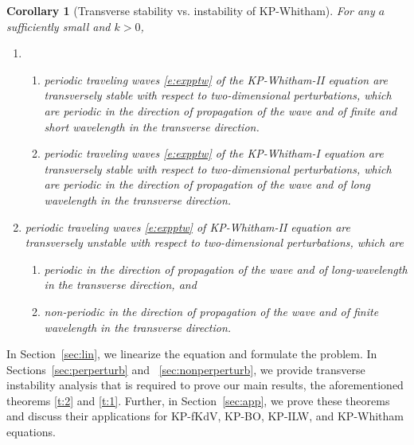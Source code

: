 \documentclass[12pt]{amsart}    %
\newtheorem{corollary}[theorem]{Corollary}
\numberwithin{equation}{section}
\begin{document}
\begin{corollary}[Transverse stability vs. instability of KP-Whitham]\label{c:whitham}
For any $a$ sufficiently small and $k>0$, 
\begin{enumerate}
\item 
\begin{enumerate}
    \item periodic traveling waves \eqref{e:expptw} of the KP-Whitham-II equation are transversely stable with respect to two-dimensional perturbations, which are periodic in the direction of propagation of the wave and of finite and short wavelength in the transverse direction.
    \item periodic traveling waves \eqref{e:expptw} of the KP-Whitham-I equation are transversely stable with respect to two-dimensional perturbations, which are periodic in the direction of propagation of the wave and of long wavelength in the transverse direction. 
\end{enumerate}
\item  periodic traveling waves \eqref{e:expptw} of KP-Whitham-II equation are transversely unstable with respect to two-dimensional perturbations, which are 
    \begin{enumerate}
        \item periodic in the direction of propagation of the wave and of long-wavelength in the transverse direction, and
        \item non-periodic in the direction of propagation of the wave and of finite wavelength in the transverse direction.
    \end{enumerate}
\end{enumerate}
\end{corollary}

In Section~\ref{sec:lin}, we linearize the equation and formulate the problem. In Sections~\ref{sec:perperturb} and ~\ref{sec:nonperperturb}, we provide transverse instability analysis that is required to prove our main results, the aforementioned theorems \ref{t:2} and \ref{t:1}. Further, in Section~\ref{sec:app}, we prove these theorems and discuss their applications for KP-fKdV, KP-BO, KP-ILW, and KP-Whitham equations. 
\end{document}
